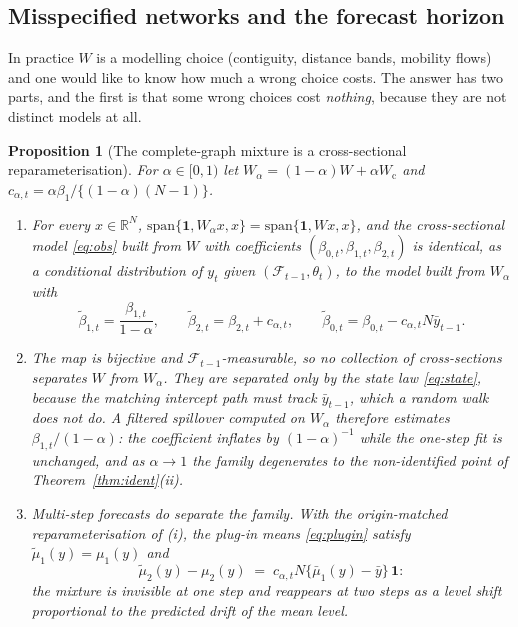 \documentclass[12pt]{article}
\theoremstyle{plain}
\newtheorem{proposition}{Proposition}
\theoremstyle{definition}
\theoremstyle{remark}
\newcommand{\R}{\mathbb{R}}
\newcommand{\one}{\mathbf{1}}
\newcommand{\calF}{\mathcal{F}}
\newcommand{\Wc}{W_{\mathrm{c}}}
\begin{document}
\subsection{Misspecified networks and the forecast horizon}\label{sec:plugin}

In practice $W$ is a modelling choice (contiguity, distance bands, mobility flows) and one would like to know how much a wrong choice costs. The answer has two parts, and the first is that some wrong choices cost \emph{nothing}, because they are not distinct models at all.

\begin{proposition}[The complete-graph mixture is a cross-sectional reparameterisation]\label{prop:equiv}
For $\alpha\in[0,1)$ let $W_\alpha=(1-\alpha)W+\alpha\Wc$ and $c_{\alpha,t}=\alpha\beta_1/\{(1-\alpha)(N-1)\}$.
\begin{enumerate}[label=(\roman*),leftmargin=*]
\item For every $x\in\R^N$, $\mathrm{span}\{\one,W_\alpha x,x\}=\mathrm{span}\{\one,Wx,x\}$, and the cross-sectional model \eqref{eq:obs} built from $W$ with coefficients $(\beta_{0,t},\beta_{1,t},\beta_{2,t})$ is \emph{identical}, as a conditional distribution of $y_t$ given $(\calF_{t-1},\theta_t)$, to the model built from $W_\alpha$ with
\[
\tilde\beta_{1,t}=\frac{\beta_{1,t}}{1-\alpha},\qquad
\tilde\beta_{2,t}=\beta_{2,t}+c_{\alpha,t},\qquad
\tilde\beta_{0,t}=\beta_{0,t}-c_{\alpha,t} N\bar y_{t-1}.
\]
\item The map is bijective and $\calF_{t-1}$-measurable, so no collection of cross-sections separates $W$ from $W_\alpha$. They are separated only by the state law \eqref{eq:state}, because the matching intercept path must track $\bar y_{t-1}$, which a random walk does not do. A filtered spillover computed on $W_\alpha$ therefore estimates $\beta_{1,t}/(1-\alpha)$: the coefficient inflates by $(1-\alpha)^{-1}$ while the one-step fit is unchanged, and as $\alpha\to1$ the family degenerates to the non-identified point of Theorem~\ref{thm:ident}\textup{(ii)}.
\item Multi-step forecasts do separate the family. With the origin-matched reparameterisation of \textup{(i)}, the plug-in means \eqref{eq:plugin} satisfy $\tilde\mu_1(y)=\mu_1(y)$ and
\[
\tilde\mu_2(y)-\mu_2(y)\;=\;c_{\alpha,t} N\{\bar\mu_1(y)-\bar y\}\,\one :
\]
the mixture is invisible at one step and reappears at two steps as a level shift proportional to the predicted drift of the mean level.
\end{enumerate}
\end{proposition}
\end{document}
